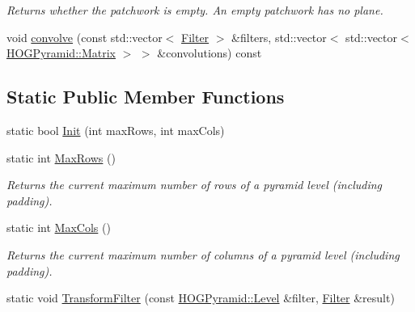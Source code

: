 \begin{DoxyCompactItemize}
\begin{DoxyCompactList}\small\item\em Returns whether the patchwork is empty. An empty patchwork has no plane. \end{DoxyCompactList}\item 
void \hyperlink{class_f_f_l_d_1_1_patchwork_a52eadb033fc06793960507cd9c6e15cb}{convolve} (const std\-::vector$<$ \hyperlink{class_f_f_l_d_1_1_patchwork_aa342f3a41430505b16a53c3e2683c497}{Filter} $>$ \&filters, std\-::vector$<$ std\-::vector$<$ \hyperlink{class_f_f_l_d_1_1_h_o_g_pyramid_a2618b4bd5d17f05cdc108189ed5abe3a}{H\-O\-G\-Pyramid\-::\-Matrix} $>$ $>$ \&convolutions) const 
\end{DoxyCompactItemize}
\subsection*{Static Public Member Functions}
\begin{DoxyCompactItemize}
\item 
static bool \hyperlink{class_f_f_l_d_1_1_patchwork_ac4aecde334ba92e8322962c7a1ae3dba}{Init} (int max\-Rows, int max\-Cols)
\item 
\hypertarget{class_f_f_l_d_1_1_patchwork_af8839b72f5a03b58d755b63237f7b3ab}{static int \hyperlink{class_f_f_l_d_1_1_patchwork_af8839b72f5a03b58d755b63237f7b3ab}{Max\-Rows} ()}\label{class_f_f_l_d_1_1_patchwork_af8839b72f5a03b58d755b63237f7b3ab}

\begin{DoxyCompactList}\small\item\em Returns the current maximum number of rows of a pyramid level (including padding). \end{DoxyCompactList}\item 
\hypertarget{class_f_f_l_d_1_1_patchwork_a46e9cff798e51e0c602a8a9cc382b314}{static int \hyperlink{class_f_f_l_d_1_1_patchwork_a46e9cff798e51e0c602a8a9cc382b314}{Max\-Cols} ()}\label{class_f_f_l_d_1_1_patchwork_a46e9cff798e51e0c602a8a9cc382b314}

\begin{DoxyCompactList}\small\item\em Returns the current maximum number of columns of a pyramid level (including padding). \end{DoxyCompactList}\item 
static void \hyperlink{class_f_f_l_d_1_1_patchwork_ad920b3c00b4b2baa4fb08433ee0a08e1}{Transform\-Filter} (const \hyperlink{class_f_f_l_d_1_1_h_o_g_pyramid_a1cd36670adf29538f44dfa434695ec34}{H\-O\-G\-Pyramid\-::\-Level} \&filter, \hyperlink{class_f_f_l_d_1_1_patchwork_aa342f3a41430505b16a53c3e2683c497}{Filter} \&result)
\end{DoxyCompactItemize}


